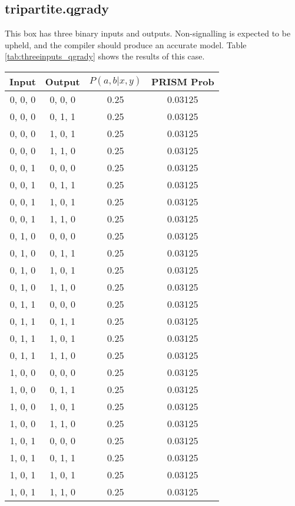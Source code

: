 \documentclass[report.tex]{subfiles}
\begin{document}
\subsection{tripartite.qgrady} %
\label{sub:threeinputs_qgrady}
This box has three binary inputs and outputs. Non-signalling is expected to
be upheld, and the compiler should produce an accurate model. Table
\ref{tab:threeinputs_qgrady} shows the results of this case.
\newpage
\begin{table}[H]
  \centering
  \begin{tabular}{c | c | c | c}
    Input & Output & \(P(a, b | x, y)\) & PRISM Prob \\
    \hline
    0, 0, 0 & 0, 0, 0 & 0.25 & 0.03125 \\
    0, 0, 0 & 0, 1, 1 & 0.25 & 0.03125 \\
    0, 0, 0 & 1, 0, 1 & 0.25 & 0.03125 \\
    0, 0, 0 & 1, 1, 0 & 0.25 & 0.03125 \\
    0, 0, 1 & 0, 0, 0 & 0.25 & 0.03125 \\
    0, 0, 1 & 0, 1, 1 & 0.25 & 0.03125 \\
    0, 0, 1 & 1, 0, 1 & 0.25 & 0.03125 \\
    0, 0, 1 & 1, 1, 0 & 0.25 & 0.03125 \\
    0, 1, 0 & 0, 0, 0 & 0.25 & 0.03125 \\
    0, 1, 0 & 0, 1, 1 & 0.25 & 0.03125 \\
    0, 1, 0 & 1, 0, 1 & 0.25 & 0.03125 \\
    0, 1, 0 & 1, 1, 0 & 0.25 & 0.03125 \\
    0, 1, 1 & 0, 0, 0 & 0.25 & 0.03125 \\
    0, 1, 1 & 0, 1, 1 & 0.25 & 0.03125 \\
    0, 1, 1 & 1, 0, 1 & 0.25 & 0.03125 \\
    0, 1, 1 & 1, 1, 0 & 0.25 & 0.03125 \\
    1, 0, 0 & 0, 0, 0 & 0.25 & 0.03125 \\
    1, 0, 0 & 0, 1, 1 & 0.25 & 0.03125 \\
    1, 0, 0 & 1, 0, 1 & 0.25 & 0.03125 \\
    1, 0, 0 & 1, 1, 0 & 0.25 & 0.03125 \\
    1, 0, 1 & 0, 0, 0 & 0.25 & 0.03125 \\
    1, 0, 1 & 0, 1, 1 & 0.25 & 0.03125 \\
    1, 0, 1 & 1, 0, 1 & 0.25 & 0.03125 \\
    1, 0, 1 & 1, 1, 0 & 0.25 & 0.03125 \\

\end{tabular}
\end{table}
\end{document}
